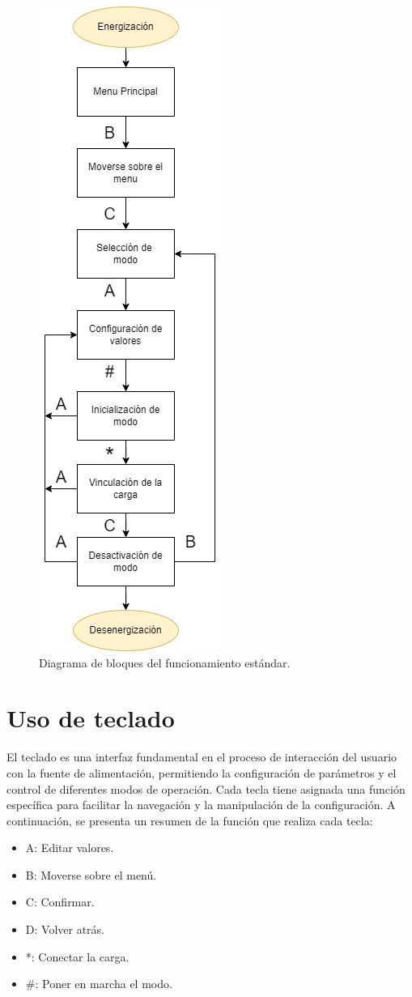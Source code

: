 \begin{figure}[H]
    \centering
    \includegraphics[scale=0.7]{./imagenes/funcionamiento_normal.jpg}
    \caption{Diagrama de bloques del funcionamiento estándar.}
    \label{F:funcionamiento_normal}
\end{figure}

\section{Uso de teclado} 
El teclado es una interfaz fundamental en el proceso de interacción del usuario con la fuente de alimentación, permitiendo la configuración de parámetros y el control de diferentes modos de operación. Cada tecla tiene asignada una función específica para facilitar la navegación y la manipulación de la configuración. A continuación, se presenta un resumen de la función que realiza cada tecla:
\begin{itemize}
    \item A: Editar valores.
    \item B: Moverse sobre el menú.
    \item C: Confirmar.
    \item D: Volver atrás.
    \item *: Conectar la carga.
    \item \#: Poner en marcha el modo.
\end{itemize}

